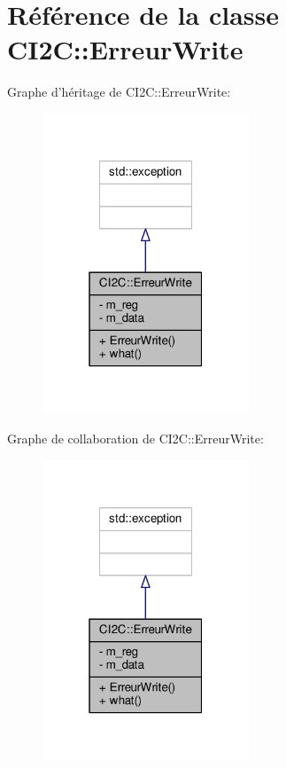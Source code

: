 \hypertarget{classCI2C_1_1ErreurWrite}{\section{Référence de la classe C\+I2\+C\+:\+:Erreur\+Write}
\label{classCI2C_1_1ErreurWrite}
}


Graphe d'héritage de C\+I2\+C\+:\+:Erreur\+Write\+:
\nopagebreak
\begin{figure}[H]
\begin{center}
\leavevmode
\includegraphics[width=175pt]{classCI2C_1_1ErreurWrite__inherit__graph}
\end{center}
\end{figure}


Graphe de collaboration de C\+I2\+C\+:\+:Erreur\+Write\+:
\nopagebreak
\begin{figure}[H]
\begin{center}
\leavevmode
\includegraphics[width=175pt]{classCI2C_1_1ErreurWrite__coll__graph}
\end{center}
\end{figure}

